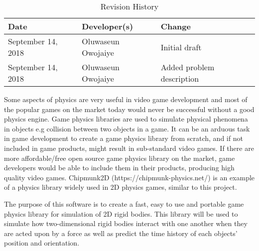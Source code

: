 \documentclass [12pt] {article}
\date{September 18, 2018}
\begin{document}
	\maketitle

\begin{table}[hp] \caption{Revision History} \label{TblRevisionHistory}
\begin{tabularx}{\textwidth}{llX} \toprule \textbf{Date} & \textbf{Developer(s)}
& \textbf{Change}\\ \midrule September 14, 2018 & Oluwaseun Owojaiye & Initial
draft\\ September 14, 2018 & Oluwaseun Owojaiye & Added problem description\\
\bottomrule \end{tabularx} \end{table}


Some aspects of physics are very useful in video game development and most of
the popular games on the market today would never be successful without a good
physics engine. Game physics libraries are used to simulate physical phenomena
in objects e.g collision between two objects in a game. It can be an arduous
task in game development to create a game physics library from scratch, and if
not included in game products, might result in sub-standard video games. If
there are more affordable/free open source game physics library on the market,
game developers would be able to include them in their products, producing high
quality video games. Chipmunk2D (https://chipmunk-physics.net/) is an example of
a physics library widely used in 2D physics games, similar to this project.

The purpose of this software is to create a fast, easy to use and portable game
physics library for simulation of 2D rigid bodies. This library will be used to
simulate how two-dimensional rigid bodies interact with one another when they
are acted upon by a force as well as predict the time history of each objects'
position and orientation.




	
\end{document}
